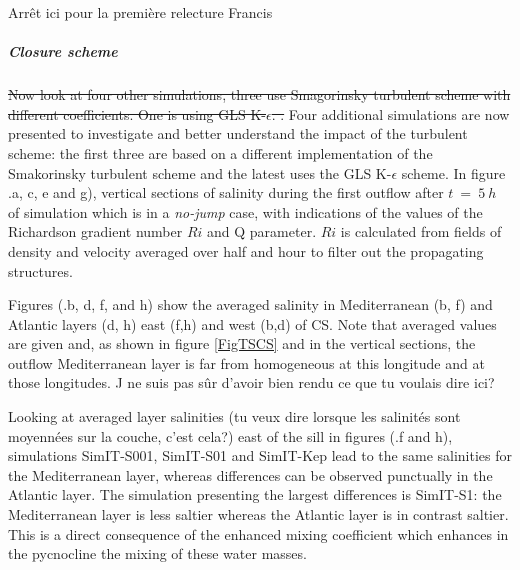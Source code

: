  \color{green} Arrêt ici pour la première relecture Francis \color{black}

\subparagraph{Closure scheme}

\color{blue}\sout{Now look at four other simulations, three use Smagorinsky turbulent scheme with different coefficients. One is using GLS K-$\epsilon$. .}
Four additional simulations are now presented to investigate and better understand the impact of the turbulent scheme: the first three are based on a different implementation of the Smakorinsky turbulent scheme and the latest uses the GLS K-$\epsilon$ scheme. \color{black}
\color{blue}In figure .a, c, e and g),\color{black} vertical sections of salinity during the first outflow \color{blue}after $t\ =\ 5\ h$ \color{black} of simulation which is in a \textit{no-jump} case, with indications of the values of the Richardson gradient number $Ri$ and Q parameter. $Ri$ is calculated from fields of density and velocity averaged over half and hour to filter out the propagating structures.

\color{blue}Figures (.b, d, f, and h) show the averaged salinity in Mediterranean (b, f) and Atlantic layers (d, h) east (f,h) and west (b,d) \color{black} of CS. Note that averaged values are given and, as shown in figure \ref{FigTSCS} and in the vertical sections, the outflow Mediterranean layer is far from homogeneous at this longitude and at those longitudes. \color{black} \color{green}J ne suis pas sûr d'avoir bien rendu ce que tu voulais dire ici? \color{black}

Looking at averaged layer salinities  \color{green}(tu veux dire lorsque les salinités sont moyennées sur la couche, c'est cela?) \color{black} east of the sill in figures (.f and h), simulations SimIT-S001, SimIT-S01 and SimIT-Kep \color{blue} lead to the same salinities for the Mediterranean layer, whereas differences can be observed punctually in the Atlantic layer. The simulation presenting the largest differences is SimIT-S1: the Mediterranean layer is less saltier whereas the Atlantic layer is in contrast saltier. This is a direct consequence of the enhanced mixing coefficient which enhances in the pycnocline the mixing of these water masses. \color{black}

